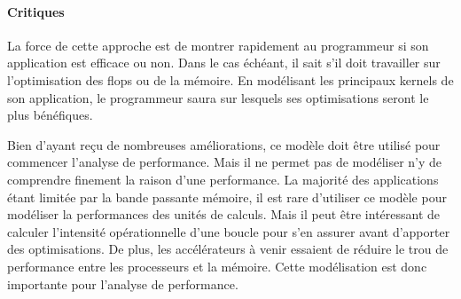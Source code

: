 \paragraph{Critiques}

La force de cette approche est de montrer rapidement au programmeur si son application est efficace ou non. Dans le cas échéant, il sait s’il doit travailler sur l’optimisation des flops ou de la mémoire. En modélisant les principaux kernels de son application, le programmeur saura sur lesquels ses optimisations seront le plus bénéfiques.

Bien d’ayant reçu de nombreuses améliorations, ce modèle doit être utilisé pour commencer l’analyse de performance. Mais il ne permet pas de modéliser n’y de comprendre finement la raison d’une performance.
La majorité des applications étant limitée par la bande passante mémoire, il est rare d’utiliser ce modèle pour modéliser la performances des unités de calculs. Mais il peut être intéressant de calculer l’intensité opérationnelle d’une boucle pour s’en assurer avant d’apporter des optimisations. De plus, les accélérateurs à venir essaient de réduire le trou de performance entre les processeurs et la mémoire. Cette modélisation est donc importante pour l’analyse de performance.
